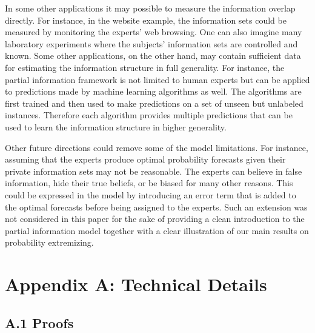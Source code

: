 \documentclass[11pt]{article}
\theoremstyle{definition}
\theoremstyle{definition}
\begin{document}
 In some other applications it may possible to measure the information overlap directly. For instance, in the website example, the information sets could be measured by monitoring the experts' web browsing. One can also imagine many laboratory experiments where the subjects' information sets are controlled and known. Some other applications, on the other hand, may contain sufficient data for estimating the information structure in full generality. For instance, the partial information framework is not limited to human experts but can be applied to predictions made by machine learning algorithms as well. The algorithms are first trained and then used to make predictions on a set of unseen but unlabeled instances. Therefore each algorithm provides multiple predictions that can be used to learn the information structure in higher generality.
 
 
 
 Other future directions could  remove some of the model limitations. For instance, assuming that the experts produce optimal probability forecasts given their private information sets may not be reasonable. The experts can believe in false information, hide their true beliefs, or be biased for many other reasons. This could be expressed in the model by introducing an error term that is added to the optimal forecasts before being assigned to the experts. Such an extension was not considered in this paper for the sake of providing a clean introduction to the partial information model together with a clear illustration of our main results on  probability extremizing. 
 
  \appendix 
\section*{Appendix A: Technical Details}
\label{appendix}

\subsection*{A.1  Proofs}
\end{document}
